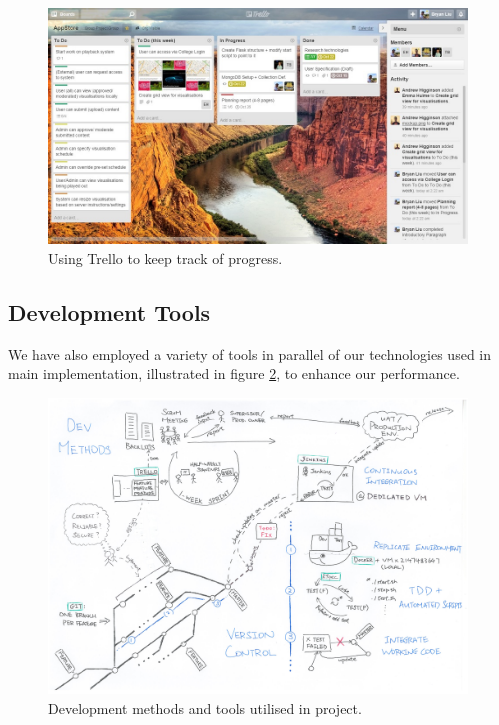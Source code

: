 \documentclass[a4paper, titlepage]{article}
\begin{document}
\begin{figure}[ht]
  \centering
    \includegraphics[width = 0.99\textwidth]{./projman/trello.jpg}
  \caption{Using Trello to keep track of progress.}
  \label{fig:trello}
\end{figure}

\subsection{Development Tools}
We have also employed a variety of tools in parallel of our technologies used
in main implementation, illustrated in figure \ref{fig:projman_devtools}, to
enhance our performance.

\begin{figure}[ht]
  \centering
    \includegraphics[width = 0.99\textwidth]{./projman/devtools.pdf}
  \caption{Development methods and tools utilised in project.}
  \label{fig:projman_devtools}
\end{figure}
\end{document}
